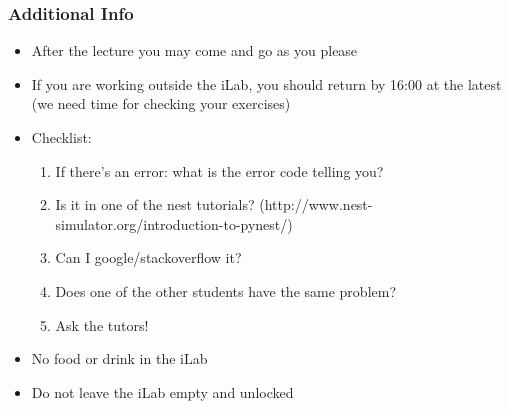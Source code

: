 \documentclass{beamer}
\begin{document}
\begin{frame}
\frametitle{Additional Info}
\begin{itemize}
\item After the lecture you may come and go as you please
\item If you are working outside the iLab, you should return by 16:00 at the latest (we need time for checking your exercises)
\item Checklist:
\begin{enumerate}
\item If there's an error: what is the error code telling you?
\item Is it in one of the nest tutorials? (http://www.nest-simulator.org/introduction-to-pynest/)
\item Can I google/stackoverflow it?
\item Does one of the other students have the same problem?
\item Ask the tutors!
\end{enumerate}

\item No food or drink in the iLab
\item Do not leave the iLab empty and unlocked
\end{itemize}

\end{frame}
\end{document}
